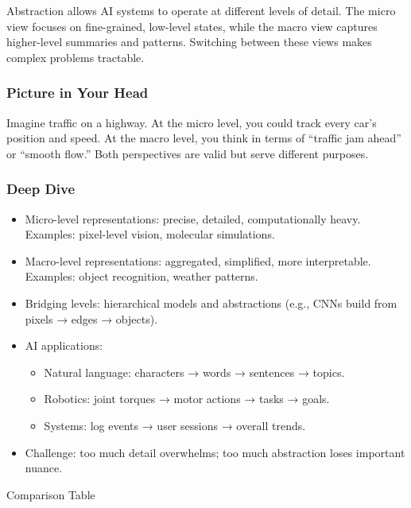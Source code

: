 \documentclass[
  letterpaper,
  DIV=11,
  numbers=noendperiod]{scrreprt}
\providecommand{\tightlist}{%
  \setlength{\itemsep}{0pt}\setlength{\parskip}{0pt}}
\begin{document}
Abstraction allows AI systems to operate at different levels of detail.
The micro view focuses on fine-grained, low-level states, while the
macro view captures higher-level summaries and patterns. Switching
between these views makes complex problems tractable.

\subsubsection{Picture in Your Head}\label{picture-in-your-head-43}

Imagine traffic on a highway. At the micro level, you could track every
car's position and speed. At the macro level, you think in terms of
``traffic jam ahead'' or ``smooth flow.'' Both perspectives are valid
but serve different purposes.

\subsubsection{Deep Dive}\label{deep-dive-43}

\begin{itemize}
\item
  Micro-level representations: precise, detailed, computationally heavy.
  Examples: pixel-level vision, molecular simulations.
\item
  Macro-level representations: aggregated, simplified, more
  interpretable. Examples: object recognition, weather patterns.
\item
  Bridging levels: hierarchical models and abstractions (e.g., CNNs
  build from pixels → edges → objects).
\item
  AI applications:

  \begin{itemize}
  \tightlist
  \item
    Natural language: characters → words → sentences → topics.
  \item
    Robotics: joint torques → motor actions → tasks → goals.
  \item
    Systems: log events → user sessions → overall trends.
  \end{itemize}
\item
  Challenge: too much detail overwhelms; too much abstraction loses
  important nuance.
\end{itemize}

Comparison Table
\end{document}
